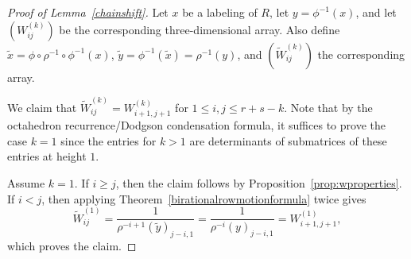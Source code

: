 \documentclass[ALCO,Unicode,published]{cedram}
\numberwithin{equation}{section}
\begin{document}
\begin{proof}[Proof of Lemma~\ref{chainshift}] Let $x$ be a labeling of $R$, let $y = \phi^{-1}(x)$, and let $(W_{ij}^{(k)})$ be the corresponding three-dimensional array. Also define $\widetilde x = \phi \circ \rho^{-1}\circ \phi^{-1}(x)$, $\widetilde y = \phi^{-1}(\widetilde x) = \rho^{-1}(y)$, and $(\widetilde W_{ij}^{(k)})$ the corresponding array.


We claim that $\widetilde W_{ij}^{(k)} = W_{i+1,j+1}^{(k)}$ for $1 \leq i,j \leq r+s-k$. Note that by the octahedron recurrence/Dodgson condensation formula, it suffices to prove the case $k=1$ since the entries for $k > 1$ are determinants of submatrices of these entries at height $1$. 

Assume $k=1$. If $i \geq j$, then the claim follows by Proposition~\ref{prop:wproperties}. If $i < j$, then applying Theorem~\ref{birationalrowmotionformula} twice gives
\[\widetilde W_{ij}^{(1)} = \frac{1}{\rho^{-i+1}(\widetilde y)_{j-i,1}} = \frac{1}{\rho^{-i}(y)_{j-i,1}} = W^{(1)}_{i+1,j+1},\] which proves the claim.


\end{proof}
\end{document}
